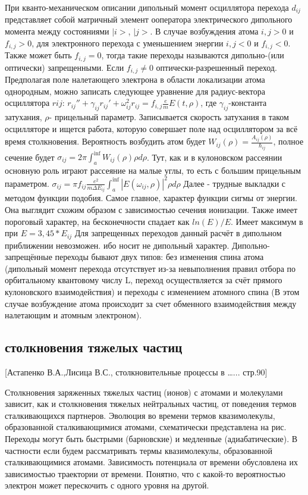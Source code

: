 \documentclass[10pt, a4paper]{article}
\begin{document}
При кванто-механическом описании дипольный момент осциллятора перехода $d_{ij}$ представляет собой матричный элемент ооператора электрического дипольного момента между состояниями $|i>$, $|j>$. В случае возбуждения атома $i,j>0$ и $f_{i,j}>0$, для электронного перехода с уменьшением энергии $i,j<0$ и $f_{i,j}<0$. Также может быть $f_{i,j}=0$, тогда такие переходы называются дипольно-(или оптически) запрещенными. Если  $f_{i,j} \ne 0$ оптически-разрешенный переход.
Предполагая поле налетающего электрона в области локализации атома однородным, можно записать следующее уравнение для радиус-вектора осциллятора $rij$:
$r_{ij}''+\gamma_{ij}r_{ij}'+\omega_{ij}^{2}r_{ij}=f_{i,j}\frac{e}{m}E(t,\rho)$, где $\gamma_{ij}$-константа затухания,  $\rho$- прицельный параметр. Записывается скорость затухания в таком осцилляторе и ищется работа, которую совершает поле над осциллятором за всё время столкновения.
Вероятность возбудить атом будет $W_{ij}(\rho)=\frac {A_{ij}(\rho)}{\hbar_{ij}}$, полное сечение  будет $\sigma_{ij}=2\pi \int_{a}^{\inf} W_{ij}(\rho)\rho d\rho$. Тут, как и в кулоновском рассеянии основную роль играют рассеяние на малые углы, то есть с большим прицельным параметром.
$\sigma_{ij}=\pi f_{ij} \frac {e^{2}}{m\Delta E_{ij} } \int_{a}^{\inf} |E(\omega_{ij},\rho)|^{2} \rho d\rho$
Далее - трудные выкладки с методом функции подобия. Самое главное, характер функции сигмы от энергии. Она выглядит схожим образом с зависимостью сечения ионизации. Также имеет пороговый характер, на бесконечности спадает как $ln(E)/E$. Имеет максимум в при $E=3,45*E_{ij}$
Для запрещенных переходов данный расчёт в дипольном приближении невозможен. ибо носит не дипольный характер. Дипольно-запрещённые переходы бывают двух типов: без изменения спина атома (дипольный момент перехода отсутствует из-за невыполнения правил отбора по орбитальному квантовому числу L, переход осуществляется за счёт прямого кулоновского взаимодействия) и переходы с изменением атомного спина (В этом случае возбуждение атома происходит за счет обменного взаимодействия между налетающим и атомным электроном).



\subsection{столкновения тяжелых частиц}
\label{sec.2.4}


[Астапенко В.А.,Лисица В.С., столкновительные процессы в …... стр.90]

Столкновения заряженных тяжелых частиц (ионов) с атомами и молекулами зависит, как и столкновения тяжелых нейтральных частиц, от поведения термов сталкивающихся партнеров. Эволюция во времени термов квазимолекулы, образованной сталкивающимися атомами, схематически представлена на рис. 
Переходы могут быть быстрыми (барновские) и медленные (адиабатические). В частности если будем рассматривать термы квазимолекулы, образованной сталкивающимися атомами. Зависимость потенциала от времени обусловлена их зависимостью траектории от времени.
Понятно, что с какой-то вероятностью электрон может перескочить с одного уровня на другой.
\end{document}
